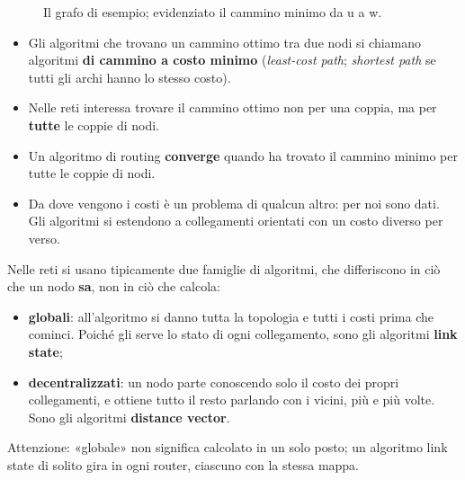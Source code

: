 
\begin{figure}[H]
\centering
{}
\caption{Il grafo di esempio; evidenziato il cammino minimo da u a w.}
\end{figure}

\begin{itemize}
    \item Gli algoritmi che trovano un cammino ottimo tra due nodi si chiamano algoritmi \textbf{di cammino a costo minimo}
          (\emph{least-cost path}; \emph{shortest path} se tutti gli archi hanno lo stesso costo).
    \item Nelle reti interessa trovare il cammino ottimo non per una coppia, ma per \textbf{tutte} le coppie di nodi.
    \item Un algoritmo di routing \textbf{converge} quando ha trovato il cammino minimo per tutte le coppie di nodi.
    \item Da dove vengono i costi è un problema di qualcun altro: per noi sono dati. Gli algoritmi si estendono a collegamenti
          orientati con un costo diverso per verso.
\end{itemize}

Nelle reti si usano tipicamente due famiglie di algoritmi, che differiscono in ciò che un nodo \textbf{sa}, non in ciò che
calcola:
\begin{itemize}
    \item \textbf{globali}: all'algoritmo si danno tutta la topologia e tutti i costi prima che cominci. Poiché gli serve lo
          stato di ogni collegamento, sono gli algoritmi \textbf{link state};
    \item \textbf{decentralizzati}: un nodo parte conoscendo solo il costo dei propri collegamenti, e ottiene tutto il resto
          parlando con i vicini, più e più volte. Sono gli algoritmi \textbf{distance vector}.
\end{itemize}
Attenzione: «globale» non significa calcolato in un solo posto; un algoritmo link state di solito gira in ogni router, ciascuno
con la stessa mappa.

